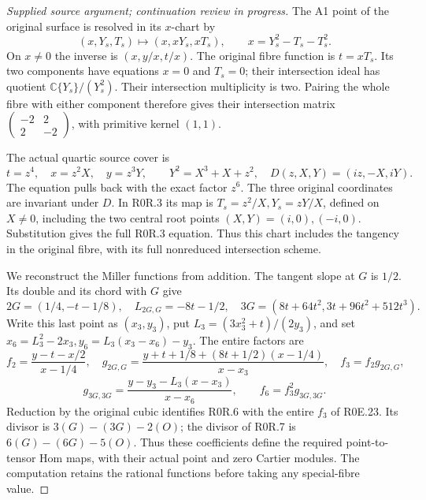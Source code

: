 \begin{proof}[Supplied source argument; continuation review in progress]
The A1 point of the original surface is resolved in its \(x\)-chart by
\[
 (x,Y_s,T_s)\longmapsto(x,xY_s,xT_s),\qquad
 x=Y_s^2-T_s-T_s^2.                              \tag{R0R.3}
\]
On \(x\ne0\) the inverse is \((x,y/x,t/x)\). The original fibre
function is \(t=xT_s\). Its two components have equations \(x=0\)
and \(T_s=0\); their intersection ideal has quotient
\(\mathbb C\{Y_s\}/(Y_s^2)\). Their intersection multiplicity is
two. Pairing the whole fibre with either component therefore gives
their intersection matrix \(\left(\begin{smallmatrix}-2&2\\2&-2
\end{smallmatrix}\right)\), with primitive kernel \((1,1)\).

The actual quartic source cover is
\[
 t=z^4,\quad x=z^2X,\quad y=z^3Y,\qquad
 Y^2=X^3+X+z^2,
 \quad D(z,X,Y)=(iz,-X,iY).                       \tag{R0R.4}
\]
The equation pulls back with the exact factor \(z^6\). The three
original coordinates are invariant under \(D\). In R0R.3 its map is
\(T_s=z^2/X,Y_s=zY/X\), defined on \(X\ne0\), including the two
central root points \((X,Y)=(i,0),(-i,0)\). Substitution gives
the full R0R.3 equation. Thus this chart includes the tangency in the
original fibre, with its full nonreduced intersection scheme.

We reconstruct the Miller functions from addition. The tangent slope
at \(G\) is \(1/2\). Its double and its chord with \(G\) give
\[
 2G=(1/4,-t-1/8),\quad L_{2G,G}=-8t-1/2,
 \quad 3G=(8t+64t^2,3t+96t^2+512t^3).             \tag{R0R.5}
\]
Write this last point as \((x_3,y_3)\), put
\(L_3=(3x_3^2+t)/(2y_3)\), and set
\(x_6=L_3^2-2x_3,y_6=L_3(x_3-x_6)-y_3\). The entire factors are
\[
 f_2=\frac{y-t-x/2}{x-1/4},\quad
 g_{2G,G}=\frac{y+t+1/8+(8t+1/2)(x-1/4)}{x-x_3},
 \quad f_3=f_2g_{2G,G},
 \tag{R0R.6}
\]
\[
 g_{3G,3G}=\frac{y-y_3-L_3(x-x_3)}{x-x_6},
 \qquad f_6=f_3^2g_{3G,3G}.                       \tag{R0R.7}
\]
Reduction by the original cubic identifies R0R.6 with the entire
\(f_3\) of R0E.23. Its divisor is \(3(G)-(3G)-2(O)\); the divisor
of R0R.7 is \(6(G)-(6G)-5(O)\). Thus these coefficients define
the required point-to-tensor Hom maps, with their actual point and
zero Cartier modules. The computation retains the rational functions
before taking any special-fibre value.


\end{proof}
